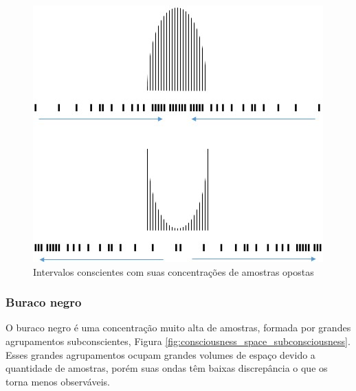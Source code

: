 \begin{figure}[H]
\caption{Intervalos conscientes com suas concentrações de amostras opostas}
\label{fig:consciousness_concentration_of_opposite_samples_within_range}
\centering
\includegraphics[scale=.8]{sections/images/consciousness_concentration_of_opposite_samples_within_range.jpg}
\end{figure}


\subsubsection{Buraco negro}
O buraco negro é uma concentração muito alta de amostras, formada por grandes agrupamentos subconscientes, Figura \ref{fig:consciousness_space_subconsciousness}.
Esses grandes agrupamentos ocupam grandes volumes de espaço devido a quantidade de amostras, porém suas ondas têm baixas discrepância o que os torna menos observáveis. 

